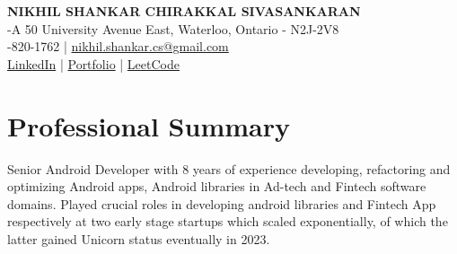 \documentclass[11pt,a4paper]{article}
\begin{document}
\begin{center}
    \textbf{\large NIKHIL SHANKAR CHIRAKKAL SIVASANKARAN} \\
    \vspace{6pt}
    -A 50 University Avenue East, Waterloo, Ontario - N2J-2V8 \\
    -820-1762 | \href{mailto:nikhil.shankar.cs@gmail.com}{nikhil.shankar.cs@gmail.com} \\
    \normalfont \href{https://www.linkedin.com/in/nikhilshankarcs}{LinkedIn} | \href{https://yourportfolio.com}{Portfolio} | \href{https://leetcode.com/yourprofile}{LeetCode}
\end{center}

\section{Professional Summary}
Senior Android Developer with 8 years of experience developing, refactoring and optimizing Android apps, Android libraries in Ad-tech and Fintech software domains. Played crucial roles in developing android libraries and Fintech App respectively at two early stage startups which scaled exponentially, of which the latter gained Unicorn status eventually in 2023.

\end{document}
